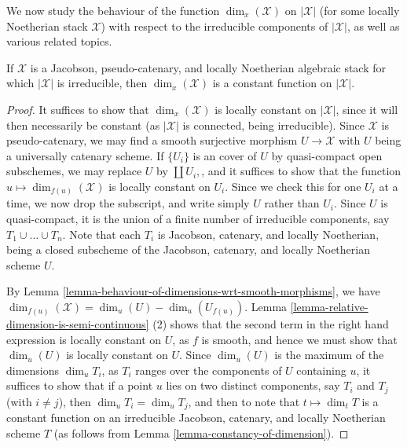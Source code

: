 \noindent
We now study the behaviour of the function $\dim_x(\mathcal{X})$ on
$|\mathcal{X}|$
(for some locally Noetherian stack $\mathcal{X}$) with respect to the
irreducible
components of $|\mathcal{X}|$, as well as various
related topics.

\begin{lemma}
\label{lemma-irreducible-implies-equidimensional}
If $\mathcal{X}$ is
a Jacobson, pseudo-catenary, and locally Noetherian  algebraic stack
for which $|\mathcal{X}|$ is irreducible,
then $\dim_x(\mathcal{X})$ is a constant function on $|\mathcal{X}|$.
\end{lemma}

\begin{proof}
It suffices to show that $\dim_x(\mathcal{X})$ is locally constant on
$|\mathcal{X}|$,
since it will then necessarily be constant (as $|\mathcal{X}|$ is connected,
being irreducible).  Since $\mathcal{X}$ is pseudo-catenary,
we may find a smooth surjective morphism $U \to \mathcal{X}$ with $U$
being a universally catenary scheme.  If $\{U_i\}$ is an
cover of $U$ by quasi-compact open subschemes, we may replace
$U$ by $\coprod U_i,$, and
it suffices to show that
the function $u \mapsto \dim_{f(u)}(\mathcal{X})$ is locally constant on $U_i$.
Since we check this for one $U_i$ at a time, we now drop the subscript,
and write simply $U$ rather than $U_i$.
Since $U$ is quasi-compact, it
is the union of a finite number of irreducible components,
say $T_1 \cup \ldots \cup T_n$.  Note that each $T_i$ is Jacobson,
catenary, and locally Noetherian,
being a closed subscheme of the Jacobson, catenary, and locally Noetherian
scheme $U$.

\medskip\noindent
By Lemma \ref{lemma-behaviour-of-dimensions-wrt-smooth-morphisms}, we have
$\dim_{f(u)}(\mathcal{X}) = \dim_{u}(U) - \dim_{u}(U_{f(u)}).$
Lemma \ref{lemma-relative-dimension-is-semi-continuous} (2)
shows that the second term in the right hand expression is locally
constant on $U$, as $f$ is smooth,
and hence we must show that $\dim_u(U)$
is locally constant on $U$.  Since $\dim_u(U)$ is the maximum
of the dimensions $\dim_u T_i$, as $T_i$ ranges over the components
of $U$ containing $u$, it suffices to show
that if a point $u$ lies on two distinct components,
say $T_i$ and $T_j$ (with $i \neq j$),
then $\dim_u T_i = \dim_u T_j$,
and then to note that $t\mapsto \dim_t T$ is a constant
function on an irreducible Jacobson,
catenary, and locally Noetherian scheme $T$
(as follows from Lemma \ref{lemma-constancy-of-dimension}).


\end{proof}
